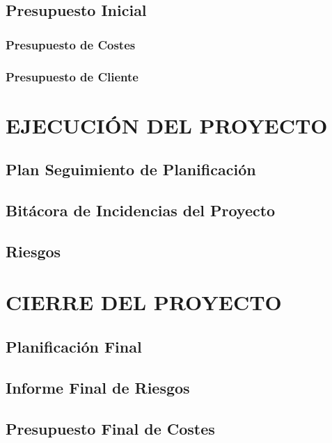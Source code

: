 \documentclass[11pt]{report}
\begin{document}
\subsection{Presupuesto Inicial}

\subsubsection{Presupuesto de Costes}

\subsubsection{Presupuesto de Cliente} 


\newpage
\section{EJECUCIÓN DEL PROYECTO}

\subsection{Plan Seguimiento de Planificación}

\subsection{Bitácora de Incidencias del Proyecto}

\subsection{Riesgos}


\newpage
\section{CIERRE DEL PROYECTO}

\subsection{Planificación Final}

\subsection{Informe Final de Riesgos}

\subsection{Presupuesto Final de Costes}
\end{document}

